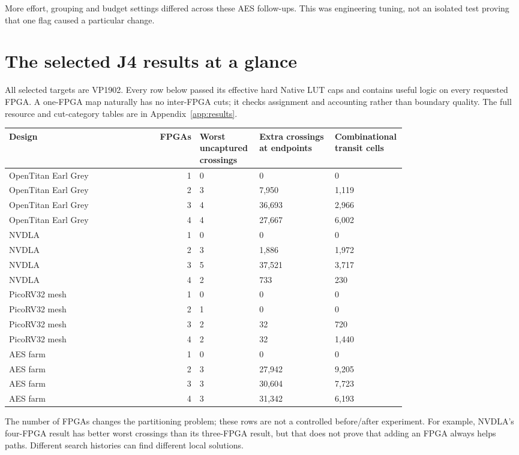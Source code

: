 \documentclass[11pt]{article}
\begin{document}
More effort, grouping and budget settings differed across these AES follow-ups. This was engineering tuning, not an isolated test proving that one flag caused a particular change.
\section{The selected J4 results at a glance}

All selected targets are VP1902. Every row below passed its effective hard Native LUT caps and contains useful logic on every requested FPGA. A one-FPGA map naturally has no inter-FPGA cuts; it checks assignment and accounting rather than boundary quality. The full resource and cut-category tables are in Appendix~\ref{app:results}.

\begin{center}\small
\begin{longtable}{p{0.25\linewidth}r p{0.15\linewidth}p{0.19\linewidth}p{0.18\linewidth}}
\toprule
Design & FPGAs & Worst uncaptured crossings & Extra crossings at endpoints & Combinational transit cells\\
\midrule\endhead
OpenTitan Earl Grey & 1 & 0 & 0 & 0\\
OpenTitan Earl Grey & 2 & 3 & 7,950 & 1,119\\
OpenTitan Earl Grey & 3 & 4 & 36,693 & 2,966\\
OpenTitan Earl Grey & 4 & 4 & 27,667 & 6,002\\
NVDLA & 1 & 0 & 0 & 0\\
NVDLA & 2 & 3 & 1,886 & 1,972\\
NVDLA & 3 & 5 & 37,521 & 3,717\\
NVDLA & 4 & 2 & 733 & 230\\
PicoRV32 mesh & 1 & 0 & 0 & 0\\
PicoRV32 mesh & 2 & 1 & 0 & 0\\
PicoRV32 mesh & 3 & 2 & 32 & 720\\
PicoRV32 mesh & 4 & 2 & 32 & 1,440\\
AES farm & 1 & 0 & 0 & 0\\
AES farm & 2 & 3 & 27,942 & 9,205\\
AES farm & 3 & 3 & 30,604 & 7,723\\
AES farm & 4 & 3 & 31,342 & 6,193\\
\bottomrule
\end{longtable}
\end{center}

The number of FPGAs changes the partitioning problem; these rows are not a controlled before/after experiment. For example, NVDLA's four-FPGA result has better worst crossings than its three-FPGA result, but that does not prove that adding an FPGA always helps paths. Different search histories can find different local solutions.
\end{document}

